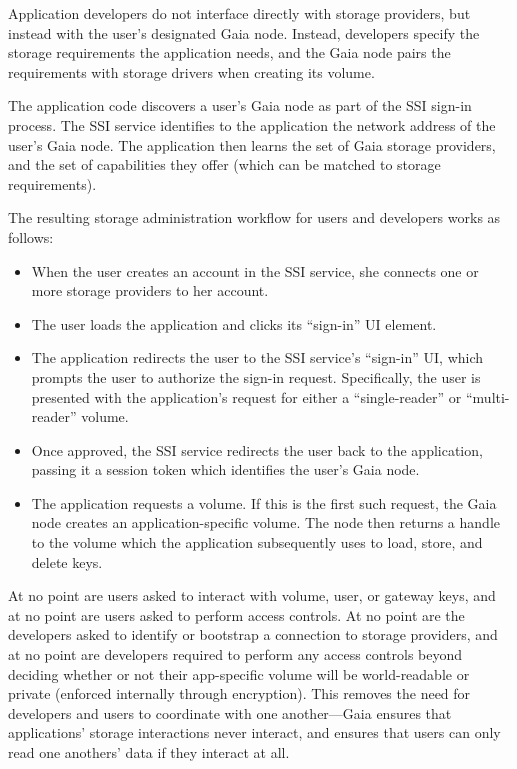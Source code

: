 Application developers do not interface directly with storage providers, but
instead with the user's designated Gaia node.
Instead, developers specify the storage requirements the
application needs, and the Gaia node pairs the requirements with storage drivers
when creating its volume.


The application code discovers a user's Gaia node as part of the SSI sign-in
process.  The SSI service identifies to the application the network address
of the user's Gaia node.  The application then learns the set of Gaia storage
providers, and the set of capabilities they offer (which can be matched to
storage requirements).

The resulting storage administration workflow for users and developers works as
follows:

\begin{itemize}
   \item When the user creates an account in the SSI service, she connects one
      or more storage providers to her account.
   \item The user loads the application and clicks its ``sign-in'' UI element.
   \item The application redirects the user to the SSI service's ``sign-in'' UI,
      which prompts the user to authorize the sign-in request.  Specifically,
      the user is presented with the application's request for either a
      ``single-reader'' or ``multi-reader'' volume.
   \item Once approved, the SSI service redirects the user back to the
      application, passing it a session token which identifies the user's Gaia
      node.
   \item The application requests a volume.  If this is the first such request,
      the Gaia node creates an application-specific volume.  The node then
      returns a handle to the volume which the application subsequently uses to
      load, store, and delete keys.
\end{itemize}

At no point are users asked to interact with volume, user, or gateway keys, and at no point
are users asked to perform access controls.  At no point are the developers
asked to identify or bootstrap a connection to storage providers, and at no
point are developers required to perform any access controls beyond deciding
whether or not their app-specific volume will be world-readable or private
(enforced internally through encryption).  This removes the need for developers
and users to coordinate with one another---Gaia ensures that applications' storage
interactions never interact, and ensures that users can only read one anothers'
data if they interact at all.


